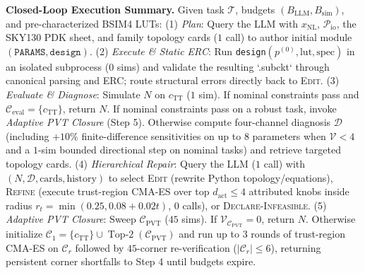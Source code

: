 \textbf{Closed-Loop Execution Summary.} Given task $\mathcal{T}$, budgets $(B_{\text{LLM}}, B_{\text{sim}})$, and pre-characterized BSIM4 LUTs:
(1) \emph{Plan}: Query the LLM with $x_{\text{NL}}$, $\mathcal{P}_{\text{io}}$, the SKY130 PDK sheet, and family topology cards ($1$ call) to author initial module $(\texttt{PARAMS}, \texttt{design})$.
(2) \emph{Execute \& Static ERC}: Run \texttt{design}$(p^{(0)}, \text{lut}, \text{spec})$ in an isolated subprocess ($0$ sims) and validate the resulting `.subckt` through canonical parsing and ERC; route structural errors directly back to \textsc{Edit}.
(3) \emph{Evaluate \& Diagnose}: Simulate $N$ on $c_{\text{TT}}$ ($1$ sim). If nominal constraints pass and $\mathcal{C}_{\text{eval}} = \{c_{\text{TT}}\}$, return $N$. If nominal constraints pass on a robust task, invoke \emph{Adaptive PVT Closure} (Step 5). Otherwise compute four-channel diagnosis $\mathcal{D}$ (including $+10\%$ finite-difference sensitivities on up to $8$ parameters when $\mathcal{V} < 4$ and a $1$-sim bounded directional step on nominal tasks) and retrieve targeted topology cards.
(4) \emph{Hierarchical Repair}: Query the LLM ($1$ call) with $(N, \mathcal{D}, \text{cards}, \text{history})$ to select \textsc{Edit} (rewrite Python topology/equations), \textsc{Refine} (execute trust-region CMA-ES over top $d_{\text{act}} \le 4$ attributed knobs inside radius $r_t = \min(0.25, 0.08 + 0.02 t)$, $0$ calls), or \textsc{Declare-Infeasible}.
(5) \emph{Adaptive PVT Closure}: Sweep $\mathcal{C}_{\text{PVT}}$ ($45$ sims). If $\mathcal{V}_{\mathcal{C}_{\text{PVT}}} = 0$, return $N$. Otherwise initialize $\mathcal{C}_1 = \{c_{\text{TT}}\} \cup \operatorname{Top-2}(\mathcal{C}_{\text{PVT}})$ and run up to $3$ rounds of trust-region CMA-ES on $\mathcal{C}_r$ followed by $45$-corner re-verification ($|\mathcal{C}_r| \le 6$), returning persistent corner shortfalls to Step 4 until budgets expire.

